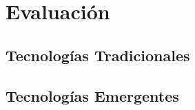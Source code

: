 \section{Evaluación}

\subsection{Tecnologías Tradicionales}


\subsection{Tecnologías Emergentes}

\newpage